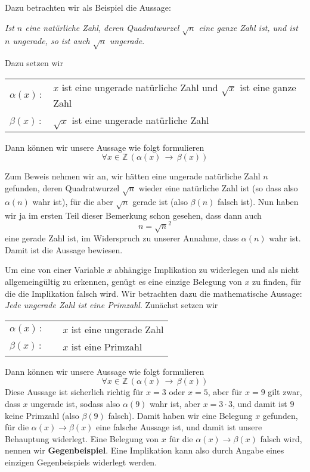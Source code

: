 \begin{notiz}
Dazu betrachten wir als Beispiel die Aussage:

\textit{Ist $n$ eine natürliche Zahl, deren Quadratwurzel $\sqrt{n}$ eine ganze Zahl ist, 
und ist $n$ ungerade, so ist auch $\sqrt{n}$ ungerade}.

Dazu setzen wir

\begin{tabular} {l l}
$\alpha(x) \,:$ &  $x$ ist eine ungerade natürliche Zahl und $\sqrt{x}$ ist eine ganze Zahl \\
$\beta(x) \,:$ &  $\sqrt{x}$ ist eine ungerade natürliche Zahl
\end{tabular}

Dann können wir unsere Aussage wie folgt formulieren
  	$$ \forall x \in \mathbb Z \, \left( \alpha(x) \, \longrightarrow \, \beta(x) \right) $$

Zum Beweis nehmen wir an, wir hätten eine ungerade natürliche Zahl $n$ gefunden, deren Quadratwurzel 
$\sqrt{n}$ wieder eine natürliche Zahl ist (so dass also $\alpha(n)$ wahr ist), für die aber 
$\sqrt{n}$ gerade ist (also $\beta(n)$ falsch ist). Nun haben wir ja im ersten Teil dieser Bemerkung schon gesehen, 
dass dann auch 
  	$$ n = \sqrt{n}^2 $$
eine gerade Zahl ist, im Widerspruch zu unserer Annahme, dass $\alpha(n)$ wahr ist. Damit ist die Aussage bewiesen.

Um eine von einer Variable $x$ abhängige Implikation zu widerlegen und als nicht allgemeingültig zu 
erkennen, genügt es eine einzige Belegung von $x$ zu finden, für die die Implikation falsch wird. Wir betrachten 
dazu die mathematische Aussage: \textit{Jede ungerade Zahl ist eine Primzahl}. Zunächst setzen wir 

\begin{tabular} {l c l}
$\alpha(x) \,:$ & \quad & $x$ ist eine ungerade Zahl \\
$\beta(x) \,:$ & \quad & $x$ ist eine Primzahl
\end{tabular}

Dann können wir unsere Aussage wie folgt formulieren
  	$$ \forall x \in \mathbb Z \, \left( \alpha(x) \, \longrightarrow \, \beta(x) \right) $$
Diese Aussage ist sicherlich richtig für $x = 3$ oder $x = 5$, aber für $x = 9$ gilt zwar, dass $x$ ungerade ist, sodass 
also $\alpha(9)$ wahr ist, aber $x = 3 \cdot 3$, und damit ist $9$ keine Primzahl (also $\beta(9)$ falsch). 
Damit haben wir eine Belegung $x$ gefunden, für die $\alpha(x) \longrightarrow \beta(x)$ eine 
falsche Aussage ist, und damit ist unsere Behauptung widerlegt. Eine Belegung von $x$ für die 
$\alpha(x) \longrightarrow \beta(x)$ falsch wird, nennen wir \textbf{Gegenbeispiel}. Eine Implikation kann 
also durch Angabe eines einzigen Gegenbeispiels widerlegt werden.
\end{notiz}



